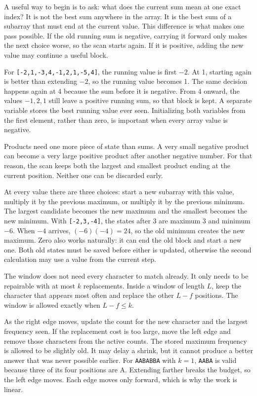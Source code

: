 
\expandafter\def\csname sourcewalkthrough@26\endcsname{%
A useful way to begin is to ask: what does the current sum
mean at one exact index? It is not the best sum anywhere in the array. It is
the best sum of a subarray that must end at the current value. This difference
is what makes one pass possible. If the old running sum is negative, carrying
it forward only makes the next choice worse, so the scan starts again. If it
is positive, adding the new value may continue a useful block.

For \texttt{[-2,1,-3,4,-1,2,1,-5,4]}, the running value is first \(-2\).
At 1, starting again is better than extending \(-2\), so the running value
becomes 1. The same decision happens again at 4 because the sum before it is
negative. From 4 onward, the values \(-1,2,1\) still leave a positive running
sum, so that block is kept. A separate variable stores the best running value
ever seen. Initializing both variables from the first element, rather than
zero, is important when every array value is negative.}

\expandafter\def\csname sourcewalkthrough@27\endcsname{%
Products need one more piece of state than sums. A very small negative product
can become a very large positive product after another negative number. For
that reason, the scan keeps both the largest and smallest product ending at
the current position. Neither one can be discarded early.

At every value there are three choices: start a new subarray with this value,
multiply it by the previous maximum, or multiply it by the previous minimum.
The largest candidate becomes the new maximum and the smallest becomes the
new minimum. With \texttt{[-2,3,-4]}, the states after 3 are maximum 3 and
minimum \(-6\). When \(-4\) arrives, \((-6)(-4)=24\), so the old minimum
creates the new maximum. Zero also works naturally: it can end the old block
and start a new one. Both old states must be saved before either is updated,
otherwise the second calculation may use a value from the current step.}

\expandafter\def\csname sourcewalkthrough@28\endcsname{%
The window does not need every character to match already. It only needs to
be repairable with at most \(k\) replacements. Inside a window of length
\(L\), keep the character that appears most often and replace the other
\(L-f\) positions. The window is allowed exactly when \(L-f\le k\).

As the right edge moves, update the count for the new character and the
largest frequency seen. If the replacement cost is too large, move the left
edge and remove those characters from the active counts. The stored maximum
frequency is allowed to be slightly old. It may delay a shrink, but it cannot
produce a better answer that was never possible earlier. For
\texttt{AABABBA} with \(k=1\), \texttt{AABA} is valid because three of its
four positions are A. Extending farther breaks the budget, so the left edge
moves. Each edge moves only forward, which is why the work is linear.}

